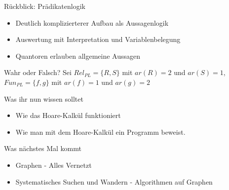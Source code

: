 



\graphicspath{{../figures/}}




\framePrevEpisode

\begin{frame}{Rückblick: Prädikatenlogik}
	\begin{itemize}[<+->]
		\item Deutlich komplizierterer Aufbau als Aussagenlogik
		\item Auswertung mit Interpretation und Variablenbelegung
		\item Quantoren erlauben allgemeine Aussagen
	\end{itemize}
\end{frame}

\begin{frame}{Wahr oder Falsch?}
	Sei $Rel_{PL} = \{R,S\}$ mit $ar(R) = 2$ und $ar(S) = 1$, \\
	$Fun_{PL} = \{f,g\}$ mit $ar(f) = 1$ und $ar(g) = 2$ 
	\begin{itemize}
	\end{itemize}
\end{frame}






\begin{frame}	
	\begin{block}{Was ihr nun wissen solltet}
		\begin{itemize}
			\item Wie das Hoare-Kalkül funktioniert
			\item Wie man mit dem Hoare-Kalkül ein Programm beweist.
		\end{itemize}
	\end{block}
	
	\begin{block}{Was nächstes Mal kommt}
		\begin{itemize}
			\item Graphen - Alles Vernetzt
			\item Systematisches Suchen und Wandern - Algorithmen auf Graphen
		\end{itemize}
	\end{block}
\end{frame}

